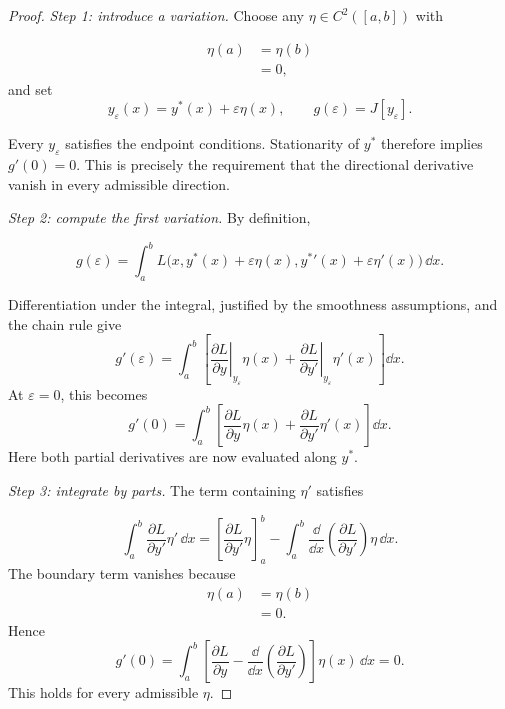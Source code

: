 \begin{proof}
\textit{Step 1: introduce a variation.} Choose any $\eta\in C^2([a,b])$ with

\[
\begin{aligned}
\eta(a) &= \eta(b) \\
&= 0,
\end{aligned}
\]
and set
\[
y_\varepsilon(x)=y^*(x)+\varepsilon\eta(x),\qquad g(\varepsilon)=J[y_\varepsilon].
\]

Every $y_\varepsilon$ satisfies the endpoint conditions. Stationarity of $y^*$ therefore implies $g'(0)=0$. This is precisely the requirement that the directional derivative vanish in every admissible direction.

\textit{Step 2: compute the first variation.} By definition,

\begin{equation}
g(\varepsilon)=\int_a^b L\big(x,y^*(x)+\varepsilon\eta(x),{y^*}'(x)+\varepsilon\eta'(x)\big)\,\dd x.
\end{equation}

Differentiation under the integral, justified by the smoothness assumptions, and the chain rule give
\begin{equation}
g'(\varepsilon)=\int_a^b\left[
\left.\frac{\partial L}{\partial y}\right|_{y_\varepsilon}\eta(x)
+\left.\frac{\partial L}{\partial y'}\right|_{y_\varepsilon}\eta'(x)\right]\dd x.
\end{equation}
At $\varepsilon=0$, this becomes
\begin{equation}
g'(0)=\int_a^b\left[\frac{\partial L}{\partial y}\eta(x)
+\frac{\partial L}{\partial y'}\eta'(x)\right]\dd x.
\end{equation}
Here both partial derivatives are now evaluated along $y^*$.

\textit{Step 3: integrate by parts.} The term containing $\eta'$ satisfies

\begin{equation}
\int_a^b\frac{\partial L}{\partial y'}\eta'\,\dd x
=\left[\frac{\partial L}{\partial y'}\eta\right]_a^b
-\int_a^b\frac{\dd}{\dd x}\left(\frac{\partial L}{\partial y'}\right)\eta\,\dd x.
\end{equation}
The boundary term vanishes because
\[
\begin{aligned}
\eta(a) &= \eta(b) \\
&= 0.
\end{aligned}
\]
Hence
\begin{equation}
g'(0)=\int_a^b\left[\frac{\partial L}{\partial y}
-\frac{\dd}{\dd x}\left(\frac{\partial L}{\partial y'}\right)\right]\eta(x)\,\dd x=0.
\end{equation}
This holds for every admissible $\eta$.


\end{proof}
